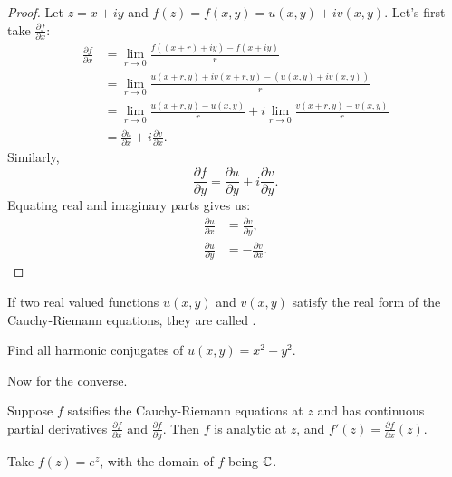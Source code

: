 \documentclass[notes]{subfile}
\begin{document}
\begin{proof}
    Let $z = x + iy$ and $f(z) = f(x,y) = u(x,y) + iv(x,y)$.
    Let's first take $\frac{\partial f}{\partial x}$:
    \begin{align*}
        \frac{\partial f}{\partial x} &= \lim_{r \to 0} \frac{f( (x+r) + iy) - f(x+iy)}{r} \\
        &= \lim_{r \to 0} \frac{u(x+r,y) + iv(x+r,y) - (u(x,y) + iv(x,y))}{r} \\
        &= \lim_{r \to 0} \frac{u(x+r,y) - u(x,y)}{r} + i\lim_{r \to 0} \frac{v(x+r,y) - v(x,y)}{r} \\
        &= \frac{\partial u}{\partial x} + i \frac{\partial v}{\partial x}.
    \end{align*}
    Similarly,
    \[ \frac{\partial f}{\partial y} = \frac{\partial u}{\partial y} + i\frac{\partial v}{\partial y}. \]
    Equating real and imaginary parts gives us:
    \begin{align*}
        \frac{\partial u}{\partial x} &= \frac{\partial v}{\partial y}, \\
        \frac{\partial u}{\partial y} &= -\frac{\partial v}{\partial x}.
    \end{align*}

\end{proof}
\noindent
If two real valued functions $u(x,y)$ and $v(x,y)$ satisfy the real form of the Cauchy-Riemann equations, they are called .

\begin{exercise}
    Find all harmonic conjugates of $u(x,y) = x^2 - y^2$.
\end{exercise}

\noindent
Now for the converse.
\begin{theorem}
    Suppose $f$ satsifies the Cauchy-Riemann equations at $z$ and has continuous partial derivatives $\frac{\partial f}{\partial x}$ and $\frac{\partial f}{\partial y}$.  Then $f$ is analytic at $z$, and $f'(z) = \frac{\partial f}{\partial x}(z)$.
\end{theorem}

\begin{example}
    Take $f(z) = e^z$, with the domain of $f$ being $\operatorname{\mathbb{C}}$.
\end{example}
\end{document}
